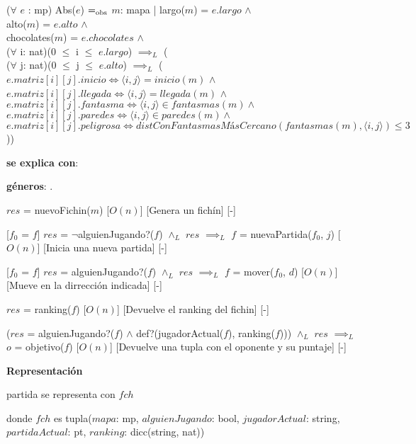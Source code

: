 \documentclass{book}
\begin{document}
        ($\forall$ $e$ : mp) Abs($e$) $=_{\mathrm{obs}}$ $m$: mapa | largo($m$) = $e.largo$ $\wedge$ \\
            \text{}\qquad alto($m$) = $e.alto$ $\wedge$ \\
            \text{}\qquad chocolates($m$) = $e.chocolates$ $\wedge$ \\
            \text{}\qquad ($\forall$ i: nat)(0 $\leq$ i $\leq$ $e.largo$) $\implies_L$ ( \\
                \text{}\qquad\quad ($\forall$ j: nat)(0 $\leq$ j $\leq$ $e.alto$) $\implies_L$ ( \\
                \text{}\qquad\quad $e.matriz[i][j].inicio \iff \langle i,j\rangle = inicio(m)$ $\wedge$ \\
                \text{}\qquad\quad $e.matriz[i][j].llegada \iff \langle i,j\rangle = llegada(m)$ $\wedge$ \\
                \text{}\qquad\quad $e.matriz[i][j].fantasma \iff \langle i,j \rangle \in fantasmas(m) \wedge $ \\
                \text{}\qquad\quad $e.matriz[i][j].paredes \iff \langle i,j \rangle \in paredes(m) \wedge $ \\
                \text{}\qquad\quad $e.matriz[i][j].peligrosa \iff distConFantasmasMásCercano(fantasmas(m), \langle i,j \rangle) \leq 3$))

    \newpage

    \begin{Interfaz}

        \textbf{se explica con}: 

        \textbf{géneros}: .


        {$res$ = nuevoFichin($m$)}%
        [$O(n)$]
        [Genera un fichín]
        [-]

        [$f_0$ = $f$]
        {$res$ = $\neg$alguienJugando?($f$) $\wedge_L$ $res$ $\implies_L$ $f$ = nuevaPartida($f_0$, $j$) }%
        [$O(n)$]
        [Inicia una nueva partida]
        [-]

        [$f_0$ = $f$]
        {$res$ = alguienJugando?($f$) $\wedge_L$ $res$ $\implies_L$ $f$ = mover($f_0$, $d$) }%
        [$O(n)$]
        [Mueve en la dirrección indicada]
        [-]

        {$res$ = ranking($f$)}%
        [$O(n)$]
        [Devuelve el ranking del fichin]
        [-]

        {($res$ = alguienJugando?($f$) $\wedge$ def?(jugadorActual($f$), ranking($f$))) $\wedge_L$ $res$ $\implies_L$ $o$ = objetivo($f$) }%
        [$O(n)$]
        [Devuelve una tupla con el oponente y su puntaje]
        [-]

    \end{Interfaz}

    \textbf{Representación}

    partida se representa con $fch$

    donde $fch$ es tupla($mapa$: mp, $alguienJugando$: bool, $jugadorActual$: string, $partidaActual$: pt, $ranking$: dicc(string, nat))
\end{document}
